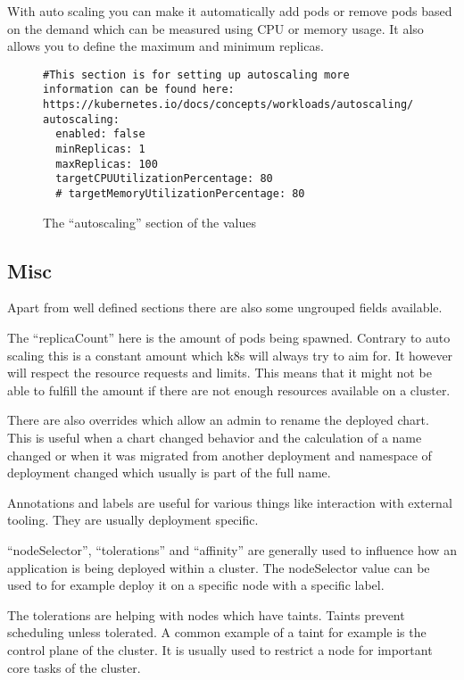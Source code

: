 With auto scaling you can make it automatically add pods or remove pods based on the demand which can be measured using CPU or memory usage.
It also allows you to define the maximum and minimum replicas.

\begin{figure}[h]
\begin{verbatim}
#This section is for setting up autoscaling more information can be found here: https://kubernetes.io/docs/concepts/workloads/autoscaling/
autoscaling:
  enabled: false
  minReplicas: 1
  maxReplicas: 100
  targetCPUUtilizationPercentage: 80
  # targetMemoryUtilizationPercentage: 80
\end{verbatim}
\caption{The \enquote{autoscaling} section of the \gls{values}}\label{code:autoscaling_section}
\end{figure}

\subsection{Misc}
Apart from well defined sections there are also some ungrouped fields available.

The \enquote{replicaCount} here is the amount of pods being spawned.
Contrary to auto scaling this is a constant amount which \gls{k8s} will always try to aim for.
It however will respect the resource requests and limits.
This means that it might not be able to fulfill the amount if there are not enough resources available on a cluster.

\bigskip
There are also overrides which allow an admin to rename the deployed chart.
This is useful when a chart changed behavior and the calculation of a name changed or when it was migrated from another deployment and namespace of deployment changed which usually is part of the full name.

\bigskip
Annotations and labels are useful for various things like interaction with external tooling.
They are usually deployment specific.

\bigskip

\enquote{nodeSelector}, \enquote{tolerations} and \enquote{affinity} are generally used to influence how an application is being deployed within a cluster.
The nodeSelector value can be used to for example deploy it on a specific node with a specific label.

The tolerations are helping with nodes which have taints.
Taints prevent scheduling unless tolerated.
A common example of a taint for example is the control plane of the cluster.
It is usually used to restrict a node for important core tasks of the cluster.

